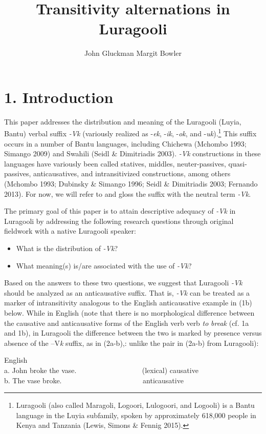 \documentclass[output=paper]{langsci/langscibook}
\title{Transitivity alternations in Luragooli}
\author{%
 John Gluckman\affiliation{UCLA}\lastand 
 Margit Bowler \affiliation{}
}
\begin{document}
 
 

\chapter{1. Introduction}

This paper addresses the distribution and meaning of the Luragooli (Luyia, Bantu) verbal suffix \textit{{}-Vk} (variously realized as -\textit{ek}, -\textit{ik}, -\textit{ok}, and -\textit{uk}).\footnote{ Luragooli (also called Maragoli, Logoori, Lulogoori, and Logooli) is a Bantu language in the Luyia subfamily, spoken by approximately 618,000 people in Kenya and Tanzania (Lewis, Simons \& Fennig 2015).} This suffix occurs in a number of Bantu languages, including Chichewa (Mchombo 1993; Simango 2009) and Swahili (Seidl \& Dimitriadis 2003). \textit{{}-Vk} constructions in these languages have variously been called statives, middles, neuter-passives, quasi-passives, anticausatives, and intransitivized constructions, among others (Mchombo 1993; Dubinsky \& Simango 1996; Seidl \& Dimitriadis 2003; Fernando 2013). For now, we will refer to and gloss the suffix with the neutral term \textit{{}-Vk}.

The primary goal of this paper is to attain descriptive adequacy of \textit{{}-Vk} in Luragooli by addressing the following research questions through original fieldwork with a native Luragooli speaker:

\begin{itemize}
\item What is the distribution of \textit{{}-Vk}?

\item What meaning(s) is/are associated with the use of \textit{{}-Vk}?

\end{itemize}

Based on the answers to these two questions, we suggest that Luragooli \textit{{}-Vk }should be analyzed as an anticausative suffix. That is, \textit{{}-Vk} can be treated as a marker of intransitivity analogous to the English anticausative example in (1b) below. While in English (note that there is no morphological difference between the causative and anticausative forms of the English verb verb \textit{to }\textit{break}\textit{ }(cf. 1a and 1b), in Luragooli the difference between the two is marked by presence versus absence of the –V\textit{k }suffix, as in (2a-b),: unlike the pair in (2a-b) from Luragooli):

\ea
{English}\\
  a.  John broke the vase.~~~ ~~~ ~~~ ~~~ ~~~       (lexical) causative \\
  b.  The vase broke. ~~~ ~~~ ~~~ ~~~ ~~~ ~~~       anticausative \\
\z
\end{document}
